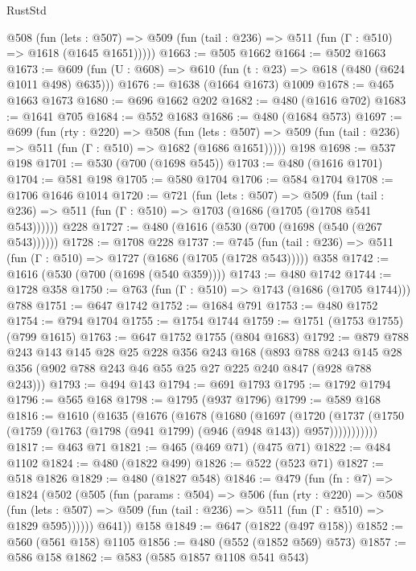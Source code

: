 \begin{lexlean}{RustStd}
\begin{coremodule}
{\begin{coremodule}
{{{{{{{{{    @508
      (fun (lets : @507) =>
      @509 (fun (tail : @236) => @511 (fun (Γ : @510) => @1618 (@1645 @1651)))))
@1663 := @505 @1662
@1664 := @502 @1663
@1673 := @609 (fun (U : @608) => @610 (fun (t : @23) => @618 (@480 (@624 @1011 @498) @635)))
@1676 := @1638 (@1664 @1673) @1009
@1678 := @465 @1663 @1673
@1680 := @696 @1662 @202
@1682 := @480 (@1616 @702)
@1683 := @1641 @705
@1684 := @552 @1683
@1686 := @480 (@1684 @573)
@1697 := @699
    (fun (rty : @220) =>
    @508
      (fun (lets : @507) =>
      @509 (fun (tail : @236) => @511 (fun (Γ : @510) => @1682 (@1686 @1651)))))
    @198
@1698 := @537 @198
@1701 := @530 (@700 (@1698 @545))
@1703 := @480 (@1616 @1701)
@1704 := @581 @198
@1705 := @580 @1704
@1706 := @584 @1704
@1708 := @1706 @1646 @1014
@1720 := @721
    (fun (lets : @507) =>
    @509 (fun (tail : @236) => @511 (fun (Γ : @510) => @1703 (@1686 (@1705 (@1708 @541 @543))))))
    @228
@1727 := @480 (@1616 (@530 (@700 (@1698 (@540 (@267 @543))))))
@1728 := @1708 @228
@1737 := @745
    (fun (tail : @236) => @511 (fun (Γ : @510) => @1727 (@1686 (@1705 (@1728 @543)))))
    @358
@1742 := @1616 (@530 (@700 (@1698 (@540 @359))))
@1743 := @480 @1742
@1744 := @1728 @358
@1750 := @763 (fun (Γ : @510) => @1743 (@1686 (@1705 @1744))) @788
@1751 := @647 @1742
@1752 := @1684 @791
@1753 := @480 @1752
@1754 := @794 @1704
@1755 := @1754 @1744
@1759 := @1751 (@1753 @1755) (@799 @1615)
@1763 := @647 @1752 @1755 (@804 @1683)
@1792 := @879
    @788
    @243
    @143
    @145
    @28
    @25
    @228
    @356
    @243
    @168
    (@893 @788 @243 @145 @28 @356 (@902 @788 @243 @46 @55 @25 @27 @225 @240 @847 (@928 @788 @243)))
@1793 := @494 @143
@1794 := @691 @1793
@1795 := @1792 @1794
@1796 := @565 @168
@1798 := @1795 (@937 @1796)
@1799 := @589 @168
@1816 := @1610
    (@1635
      (@1676
        (@1678
          (@1680
            (@1697
              (@1720
                (@1737 (@1750 (@1759 (@1763 (@1798 (@941 @1799) (@946 (@948 @143)) @957)))))))))))
@1817 := @463 @71
@1821 := @465 (@469 @71) (@475 @71)
@1822 := @484 @1102
@1824 := @480 (@1822 @499)
@1826 := @522 (@523 @71)
@1827 := @518 @1826
@1829 := @480 (@1827 @548)
@1846 := @479
    (fun (fn : @7) =>
    @1824
      (@502
        (@505
          (fun (params : @504) =>
          @506
            (fun (rty : @220) =>
            @508
              (fun (lets : @507) =>
              @509 (fun (tail : @236) => @511 (fun (Γ : @510) => @1829 @595))))))
        @641))
    @158
@1849 := @647 (@1822 (@497 @158))
@1852 := @560 (@561 @158) @1105
@1856 := @480 (@552 (@1852 @569) @573)
@1857 := @586 @158
@1862 := @583 (@585 @1857 @1108 @541 @543)
}}}}}}}}}
\end{coremodule}}
\end{coremodule}
\end{lexlean}
